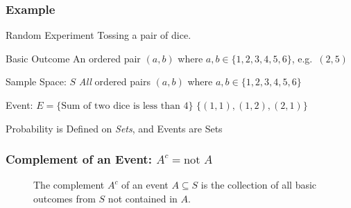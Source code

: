 \documentclass[handout]{beamer}
\begin{document}
\begin{frame}
\frametitle{Example}
\pause
\begin{block}{Random Experiment}
Tossing a pair of dice.
\end{block}
\pause
\begin{block}{Basic Outcome}
An ordered pair $(a, b)$ where $a,b \in \{1, 2, 3, 4, 5, 6\}$, e.g.\ $(2,5)$
\end{block}
\pause
\begin{block}{Sample Space: $S$}
\emph{All} ordered pairs $(a, b)$ where $a,b \in \{1, 2, 3, 4, 5, 6\}$
\end{block}
\pause

\begin{block}{Event: $E = \{\mbox{Sum of two dice is less than 4}\}$}
$\{(1,1), (1,2), (2,1)\}$
\end{block}

\end{frame}
\begin{frame}
\begin{center}
	\Huge Probability is Defined on \emph{Sets}, and Events are Sets
\end{center}
\end{frame}
\def\eventA{(-0.35,0) circle (1.2)}
\def\eventB{(1.35,0) circle (1.2)}
\def\samplespace{(-2,-2) rectangle (3,2)}
\begin{frame}
\frametitle{Complement of an Event: $A^c = \mbox{not } A$}

\begin{figure}
\centering
{}
\caption{The complement $A^c$ of an event $A\subseteq S$ is the collection of all basic outcomes from $S$ not contained in $A$.}
\end{figure}
\end{frame}
\end{document}
